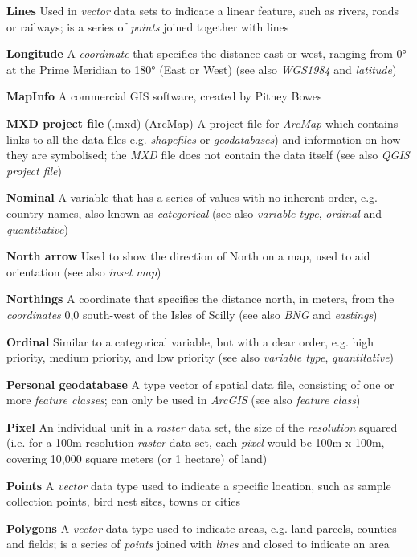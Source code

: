 \documentclass[a4paper,10pt]{article}
\begin{document}
\begin{multicols}{2}
\textbf{Lines} Used in \textit{vector} data sets to indicate a linear feature, such as rivers, roads or railways; is a series of \textit{points} joined together with lines

\textbf{Longitude} A \textit{coordinate} that specifies the distance east or west, ranging from \ang{0} at the Prime Meridian to \ang{180} (East or West) (see also \textit{WGS1984} and \textit{latitude})

\textbf{MapInfo} A commercial GIS software, created by Pitney Bowes 

\textbf{MXD project file} (.mxd) (ArcMap) A project file for \textit{ArcMap} which contains links to all the data files e.g. \textit{shapefiles} or \textit{geodatabases}) and information on how they are symbolised; the \textit{MXD} file does not contain the data itself (see also \textit{QGIS project file})

\textbf{Nominal} A variable that has a series of values with no inherent order, e.g. country names, also known as \textit{categorical} (see also \textit{variable type}, \textit{ordinal} and \textit{quantitative})

\textbf{North arrow} Used to show the direction of North on a map, used to aid orientation (see also \textit{inset map})

\textbf{Northings} A coordinate that specifies the distance north, in meters, from the \textit{coordinates} 0,0 south-west of the Isles of Scilly (see also \textit{BNG} and \textit{eastings})

\textbf{Ordinal} Similar to a categorical variable, but with a clear order, e.g. high priority, medium priority, and low priority (see also \textit{variable type}, \textit{quantitative}) 

\textbf{Personal geodatabase} A type vector of spatial data file, consisting of one or more \textit{feature classes}; can only be used in \textit{ArcGIS} (see also \textit{feature class})

\textbf{Pixel} An individual unit in a \textit{raster} data set, the size of the \textit{resolution} squared (i.e. for a 100m resolution \textit{raster} data set, each \textit{pixel} would be 100m x 100m, covering 10,000 square meters (or 1 hectare) of land)

\textbf{Points} A \textit{vector} data type used to indicate a specific location, such as sample collection points, bird nest sites, towns or cities

\textbf{Polygons} A \textit{vector} data type used to indicate areas, e.g. land parcels, counties and fields; is a series of \textit{points} joined with \textit{lines} and closed to indicate an area


\end{multicols}
\end{document}
